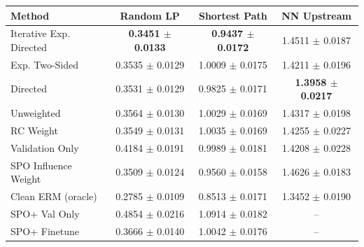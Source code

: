 \begin{tabular}{lccc}
\toprule
Method & Random LP & Shortest Path & NN Upstream \\
\midrule
Iterative Exp. Directed & \textbf{0.3451 $\pm$ 0.0133} & \textbf{0.9437 $\pm$ 0.0172} & 1.4511 $\pm$ 0.0187 \\
Exp. Two-Sided & 0.3535 $\pm$ 0.0129 & 1.0009 $\pm$ 0.0175 & 1.4211 $\pm$ 0.0196 \\
Directed & 0.3531 $\pm$ 0.0129 & 0.9825 $\pm$ 0.0171 & \textbf{1.3958 $\pm$ 0.0217} \\
Unweighted & 0.3564 $\pm$ 0.0130 & 1.0029 $\pm$ 0.0169 & 1.4317 $\pm$ 0.0198 \\
RC Weight & 0.3549 $\pm$ 0.0131 & 1.0035 $\pm$ 0.0169 & 1.4255 $\pm$ 0.0227 \\
Validation Only & 0.4184 $\pm$ 0.0191 & 0.9989 $\pm$ 0.0181 & 1.4208 $\pm$ 0.0228 \\
SPO Influence Weight & 0.3509 $\pm$ 0.0124 & 0.9560 $\pm$ 0.0158 & 1.4626 $\pm$ 0.0183 \\
Clean ERM (oracle) & 0.2785 $\pm$ 0.0109 & 0.8513 $\pm$ 0.0171 & 1.3452 $\pm$ 0.0190 \\
SPO+ Val Only & 0.4854 $\pm$ 0.0216 & 1.0914 $\pm$ 0.0182 & -- \\
SPO+ Finetune & 0.3666 $\pm$ 0.0140 & 1.0042 $\pm$ 0.0176 & -- \\
\bottomrule
\end{tabular}

